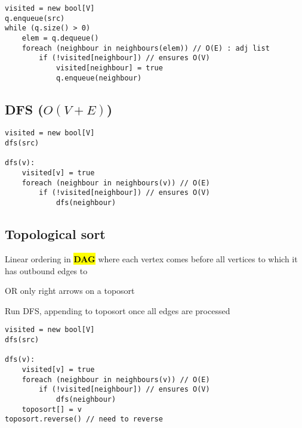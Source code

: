 \documentclass[12pt]{article}
\begin{document}
\begin{spacing}{1.5}
\begin{verbatim}
visited = new bool[V]
q.enqueue(src)
while (q.size() > 0)
    elem = q.dequeue()
    foreach (neighbour in neighbours(elem)) // O(E) : adj list
        if (!visited[neighbour]) // ensures O(V)
    	    visited[neighbour] = true
    	    q.enqueue(neighbour) 
\end{verbatim}

\subsection{DFS ($O(V+E)$)}

\begin{verbatim}
visited = new bool[V]
dfs(src)

dfs(v): 
    visited[v] = true
    foreach (neighbour in neighbours(v)) // O(E)
        if (!visited[neighbour]) // ensures O(V)
            dfs(neighbour)
\end{verbatim}

\subsection{Topological sort}

\begin{itemize*}
	\item Linear ordering in \textbf{\hl{DAG}} where each vertex comes before all vertices to which it has outbound edges to
	\item OR only right arrows on a toposort
	\item Run DFS, appending to toposort once all edges are processed
\end{itemize*}

\begin{verbatim}
visited = new bool[V]
dfs(src)

dfs(v): 
    visited[v] = true
    foreach (neighbour in neighbours(v)) // O(E)
        if (!visited[neighbour]) // ensures O(V)
            dfs(neighbour)
    toposort[] = v
toposort.reverse() // need to reverse
\end{verbatim}


\end{spacing}
\end{document}
